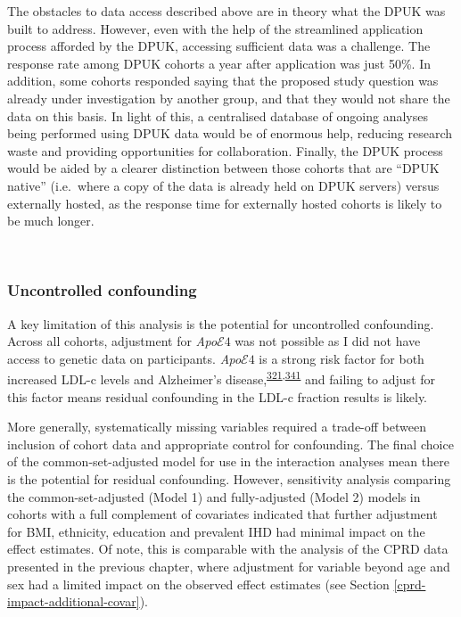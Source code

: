 \documentclass[a4paper, twoside]{templates/ociamthesis}
\begin{document}
The obstacles to data access described above are in theory what the DPUK was built to address. However, even with the help of the streamlined application process afforded by the DPUK, accessing sufficient data was a challenge. The response rate among DPUK cohorts a year after application was just 50\%. In addition, some cohorts responded saying that the proposed study question was already under investigation by another group, and that they would not share the data on this basis. In light of this, a centralised database of ongoing analyses being performed using DPUK data would be of enormous help, reducing research waste and providing opportunities for collaboration. Finally, the DPUK process would be aided by a clearer distinction between those cohorts that are ``DPUK native'' (i.e.~where a copy of the data is already held on DPUK servers) versus externally hosted, as the response time for externally hosted cohorts is likely to be much longer.

~

\hypertarget{uncontrolled-confounding}{%
\subsubsection{Uncontrolled confounding}\label{uncontrolled-confounding}}

A key limitation of this analysis is the potential for uncontrolled confounding. Across all cohorts, adjustment for \emph{Apo}\(\mathcal{E}4\) was not possible as I did not have access to genetic data on participants. \emph{Apo}\(\mathcal{E}4\) is a strong risk factor for both increased LDL-c levels and Alzheimer's disease,\textsuperscript{\protect\hyperlink{ref-bennet2007}{321},\protect\hyperlink{ref-safieh2019}{341}} and failing to adjust for this factor means residual confounding in the LDL-c fraction results is likely.

More generally, systematically missing variables required a trade-off between inclusion of cohort data and appropriate control for confounding. The final choice of the common-set-adjusted model for use in the interaction analyses mean there is the potential for residual confounding. However, sensitivity analysis comparing the common-set-adjusted (Model 1) and fully-adjusted (Model 2) models in cohorts with a full complement of covariates indicated that further adjustment for BMI, ethnicity, education and prevalent IHD had minimal impact on the effect estimates. Of note, this is comparable with the analysis of the CPRD data presented in the previous chapter, where adjustment for variable beyond age and sex had a limited impact on the observed effect estimates (see Section \ref{cprd-impact-additional-covar}).
\end{document}
